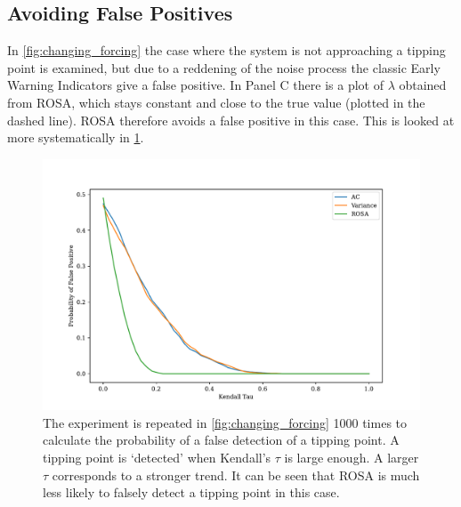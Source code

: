 \subsection{Avoiding False Positives}
In \cref{fig:changing_forcing} the case where the 
system is not approaching a tipping point is examined, but due to a reddening of 
the noise process the classic Early Warning Indicators give a 
false positive. In Panel C there is a plot of $\lambda$ obtained from ROSA, which stays constant and close to the true
value (plotted in the dashed line). ROSA therefore avoids a false positive in this case. This is looked at more
systematically in \cref{fig:false_positives_white}.
\begin{figure}
  \centering
  \includegraphics[width=\textwidth]{false_positives_whitenoise}
  \caption[False positive with white noise]{The experiment is repeated in \cref{fig:changing_forcing} 1000 times to
    calculate the probability of a false detection of a tipping point. A tipping point is `detected' when Kendall's $\tau$ is large enough. A larger $\tau$
    corresponds to a stronger trend. It can be seen that ROSA is much less likely to falsely detect a tipping point in this case.}
  \label{fig:false_positives_white}
\end{figure}


